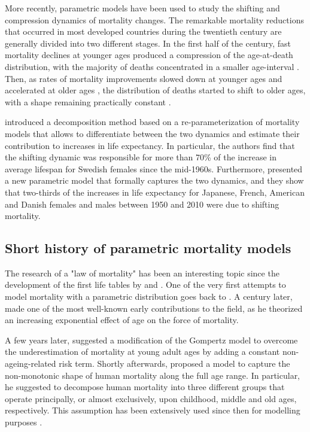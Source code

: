 \documentclass[Thesis]{subfiles}
\begin{document}
More recently, parametric models have been used to study the shifting and compression dynamics of mortality changes. The remarkable mortality reductions that occurred in most developed countries during the twentieth century are generally divided into two different stages. In the first half of the century, fast mortality declines at younger ages produced a compression of the age-at-death distribution, with the majority of deaths concentrated in a smaller age-interval  \citep{fries1980aging,myers1984compression,rothenberg1991population,kannisto2000measuring,cheung2009dissecting}. Then, as rates of mortality improvements slowed down at younger ages and accelerated at older ages \citep{kannisto1994reductions,vaupel1998biodemographic,wilmoth1999rectangularization}, the distribution of deaths started to shift to older ages, with a shape remaining practically constant \citep{bongaarts2005long,cheung2005three,cheung2007increase,canudas2008modal}.

\cite{bergeron2015decomposing} introduced a decomposition method based on a re-parameterization of mortality models that allows to differentiate between the two dynamics and estimate their contribution to increases in life expectancy. In particular, the authors find that the shifting dynamic was responsible for more than 70\% of the increase in average lifespan for Swedish females since the mid-1960s. Furthermore, \cite{de2016new} presented a new parametric model that formally captures the two dynamics, and they show that two-thirds of the increases in life expectancy for Japanese, French, American and Danish females and males between 1950 and 2010 were due to shifting mortality.

\subsection{Short history of parametric mortality models}
\label{Subsec:Ch2subsec1.2}

The research of a "law of mortality" has been an interesting topic since the development of the first life tables by \cite{graunt1662natural} and \cite{halley1693estimate}. One of the very first attempts to model mortality with a parametric distribution goes back to \cite{demoivre1725annuities}. A century later, \cite{gompertz1825nature} made one of the most well-known early contributions to the field, as he theorized an increasing exponential effect of age on the force of mortality. 

A few years later, \cite{makeham1860law} suggested a modification of the Gompertz model to overcome the underestimation of mortality at young adult ages by adding a constant non-ageing-related risk term. Shortly afterwards, \cite{thiele1871mathematical} proposed a model to capture the non-monotonic shape of human mortality along the full age range. In particular, he suggested to decompose human mortality into three different groups that operate principally, or almost exclusively, upon childhood, middle and old ages, respectively. This assumption has been extensively used since then for modelling purposes \citep{siler1979competing,heligman1980age}. 
\end{document}
